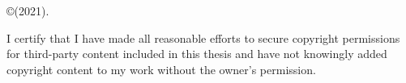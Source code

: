 
©\authorname (2021). 

\vspace{\baselineskip}

\noindent I certify that I have made all reasonable efforts to secure copyright permissions for third-party content included in this thesis and have not knowingly added copyright content to my work without the owner's permission.
